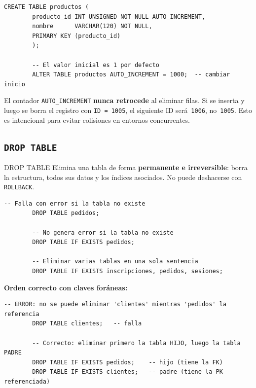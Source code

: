 \documentclass[12pt, a4paper]{article}
\begin{document}
	\begin{lstlisting}[style=sql, caption={AUTO\_INCREMENT en contexto}]
		CREATE TABLE productos (
		producto_id INT UNSIGNED NOT NULL AUTO_INCREMENT,
		nombre      VARCHAR(120) NOT NULL,
		PRIMARY KEY (producto_id)
		);
		
		-- El valor inicial es 1 por defecto
		ALTER TABLE productos AUTO_INCREMENT = 1000;  -- cambiar inicio
	\end{lstlisting}
	
	\begin{nota}
		El contador \texttt{AUTO\_INCREMENT} \textbf{nunca retrocede} al eliminar
		filas. Si se inserta y luego se borra el registro con \texttt{ID = 1005},
		el siguiente ID será~\texttt{1006}, no~\texttt{1005}. Esto es intencional
		para evitar colisiones en entornos concurrentes.
	\end{nota}
	
	\subsection{\texttt{DROP TABLE}}
	
	\begin{definicion}{DROP TABLE}
		Elimina una tabla de forma \textbf{permanente e irreversible}: borra la
		estructura, todos sus datos y los índices asociados. No puede deshacerse
		con \texttt{ROLLBACK}.
	\end{definicion}
	
	\begin{lstlisting}[style=sql, caption={DROP TABLE básico y con guarda}]
		-- Falla con error si la tabla no existe
		DROP TABLE pedidos;
		
		-- No genera error si la tabla no existe
		DROP TABLE IF EXISTS pedidos;
		
		-- Eliminar varias tablas en una sola sentencia
		DROP TABLE IF EXISTS inscripciones, pedidos, sesiones;
	\end{lstlisting}
	
	\textbf{Orden correcto con claves foráneas:}
	
	\begin{lstlisting}[style=sql, caption={DROP TABLE respetando integridad referencial}]
		-- ERROR: no se puede eliminar 'clientes' mientras 'pedidos' la referencia
		DROP TABLE clientes;   -- falla
		
		-- Correcto: eliminar primero la tabla HIJO, luego la tabla PADRE
		DROP TABLE IF EXISTS pedidos;    -- hijo (tiene la FK)
		DROP TABLE IF EXISTS clientes;   -- padre (tiene la PK referenciada)
	\end{lstlisting}
	
\end{document}
